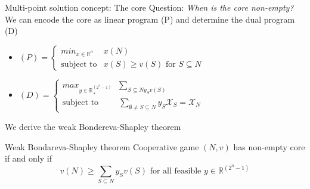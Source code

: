 \documentclass{beamer}
\newcommand{\R}{\mathbb{R}}
\begin{document}
\begin{frame}{Multi-point solution concept: The core}
    Question: \textit{When is the core non-empty?} \\
	We can encode the core as linear program (P) and determine the dual program (D)
    \begin{itemize}
		\item $\left(P\right)=\begin{cases}
			min_{x \in \R^n} & x \left(N\right) \\
			\text{subject to} &x\left(S\right) \geq v\left(S\right)\text{ for }S \subseteq N
		\end{cases}$
		\item $\left(D\right)=\begin{cases}
			max_{y \in \R_{+}^{\left(2^n-1\right)}} & \sum_{S \subseteq N y_S v\left(S\right)} \\
			\text{subject to} & \sum_{\emptyset \neq S \subseteq N} y_S \mathcal{X}_S = \mathcal{X}_N
		\end{cases}$
	\end{itemize}
	We derive the weak Bondereva-Shapley theorem
	\begin{block}{Weak Bondareva-Shapley theorem}
		Cooperative game $\left(N,v\right)$ has non-empty core if and only if 
		\[
			v\left(N\right) \geq \sum_{S \subseteq N} y_S v\left(S\right)\text{ for all feasible }y \in \R^{\left(2^n-1\right)}
		\]
	\end{block}
\end{frame}


\end{document}
